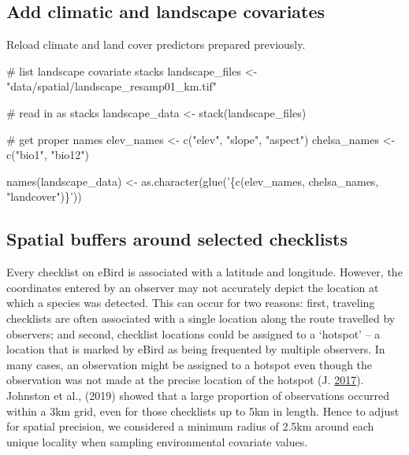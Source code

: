 \documentclass[]{article}
\newenvironment{Shaded}{}{}
\newcommand{\CommentTok}[1]{\textcolor[rgb]{0.00,0.50,0.00}{#1}}
\newcommand{\KeywordTok}[1]{\textcolor[rgb]{0.00,0.00,1.00}{#1}}
\newcommand{\NormalTok}[1]{#1}
\newcommand{\StringTok}[1]{\textcolor[rgb]{0.00,0.50,0.50}{#1}}
\begin{document}
\hypertarget{add-climatic-and-landscape-covariates}{%
\subsection{Add climatic and landscape covariates}\label{add-climatic-and-landscape-covariates}}

Reload climate and land cover predictors prepared previously.

\begin{Shaded}
\begin{Highlighting}[numbers=left,,]

\CommentTok{# list landscape covariate stacks}
\NormalTok{landscape_files <-}\StringTok{ "data/spatial/landscape_resamp01_km.tif"}

\CommentTok{# read in as stacks}
\NormalTok{landscape_data <-}\StringTok{ }\KeywordTok{stack}\NormalTok{(landscape_files)}

\CommentTok{# get proper names}
\NormalTok{elev_names <-}\StringTok{ }\KeywordTok{c}\NormalTok{(}\StringTok{"elev"}\NormalTok{, }\StringTok{"slope"}\NormalTok{, }\StringTok{"aspect"}\NormalTok{)}
\NormalTok{chelsa_names <-}\StringTok{ }\KeywordTok{c}\NormalTok{(}\StringTok{"bio1"}\NormalTok{, }\StringTok{"bio12"}\NormalTok{)}

\KeywordTok{names}\NormalTok{(landscape_data) <-}\StringTok{ }\KeywordTok{as.character}\NormalTok{(}\KeywordTok{glue}\NormalTok{(}\StringTok{'\{c(elev_names, chelsa_names, "landcover")\}'}\NormalTok{))}
\end{Highlighting}
\end{Shaded}

\hypertarget{spatial-buffers-around-selected-checklists}{%
\subsection{Spatial buffers around selected checklists}\label{spatial-buffers-around-selected-checklists}}

Every checklist on eBird is associated with a latitude and longitude. However, the coordinates entered by an observer may not accurately depict the location at which a species was detected. This can occur for two reasons: first, traveling checklists are often associated with a single location along the route travelled by observers; and second, checklist locations could be assigned to a `hotspot' -- a location that is marked by eBird as being frequented by multiple observers. In many cases, an observation might be assigned to a hotspot even though the observation was not made at the precise location of the hotspot (J. \protect\hyperlink{ref-praveenj.2017}{2017}). Johnston et al., (2019) showed that a large proportion of observations occurred within a 3km grid, even for those checklists up to 5km in length. Hence to adjust for spatial precision, we considered a minimum radius of 2.5km around each unique locality when sampling environmental covariate values.
\end{document}
